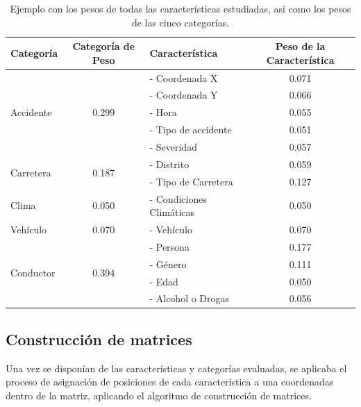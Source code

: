 \documentclass{uathesis-es}
\begin{document}
\begin{table}[H]
	\centering
	\begin{tabular}{ |l|c|l|c| }
		\hline
		\textbf{Categoría} & \textbf{Categoría de Peso} & \textbf{Característica} & \textbf{Peso de la Característica}\\
		\hline
		\multirow{5}{*}{Accidente}   & \multirow{5}{*}{0.299}  & - Coordenada X & 0.071\\
		&  & - Coordenada Y  & 0.066\\
		&  & - Hora & 0.055\\
		&  & - Tipo de accidente  & 0.051\\
		&  & - Severidad & 0.057\\
		\hline
		\multirow{2}{*}{Carretera}   & \multirow{2}{*}{0.187}   & - Distrito  & 0.059\\      
		&  & - Tipo de Carretera        & 0.127\\
		\hline
		\multirow{1}{*}{Clima}  & \multirow{1}{*}{0.050}  & - Condiciones Climáticas  & 0.050\\
		\hline
		\multirow{1}{*}{Vehículo}  & \multirow{1}{*}{0.070}        & - Vehículo  & 0.070\\
		\hline
		\multirow{4}{*}{Conductor}   & \multirow{4}{*}{0.394} & - Persona    & 0.177\\
		&      & - Género      & 0.111\\
		&      & - Edad      & 0.050\\
		&      & - Alcohol o Drogas  & 0.056\\
		\hline
	\end{tabular}
	\caption{Ejemplo con los pesos de todas las características estudiadas, así como los pesos de las cinco categorías.}
	\label{1stPaperWeightsFinalCharacteristics}
\end{table}


\subsection{Construcción de matrices}

Una vez se disponían de las características y categorías evaluadas, se aplicaba el proceso de asignación de posiciones de cada característica a una coordenadas dentro de la matriz, aplicando el algoritmo de construcción de matrices.
\end{document}
